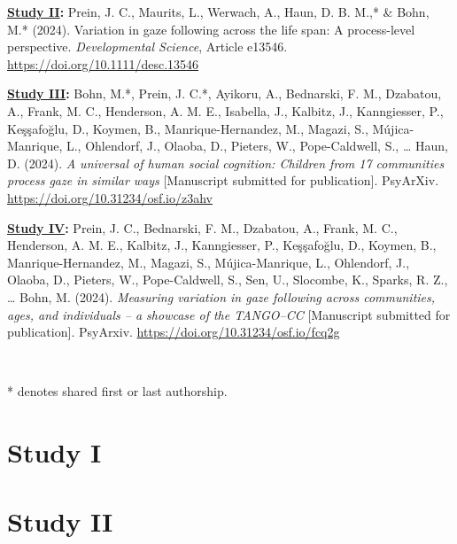 \documentclass[
]{scrbook}
\begin{document}
\textbf{\hyperref[studyII]{Study II}:} Prein, J. C., Maurits, L., Werwach, A., Haun, D. B. M.,* \& Bohn, M.* (2024). Variation in gaze following across the life span: A process-level perspective. \emph{Developmental Science}, Article e13546. \mbox{\url{https://doi.org/10.1111/desc.13546}}

\textbf{\hyperref[studyIII]{Study III}:} Bohn, M.*, Prein, J. C.*, Ayikoru, A., Bednarski, F. M., Dzabatou, A., Frank, M. C., Henderson, A. M. E., Isabella, J., Kalbitz, J., Kanngiesser, P., Keşşafoğlu, D., Koymen, B., Manrique-Hernandez, M., Magazi, S., Mújica-Manrique, L., Ohlendorf, J., Olaoba, D., Pieters, W., Pope-Caldwell, S., \ldots{} Haun, D. (2024). \emph{A universal of human social cognition: Children from 17 communities process gaze in similar ways} {[}Manuscript submitted for publication{]}. PsyArXiv. \mbox{\url{https://doi.org/10.31234/osf.io/z3ahv}}

\textbf{\hyperref[studyIV]{Study IV}:} Prein, J. C., Bednarski, F. M., Dzabatou, A., Frank, M. C., Henderson, A. M. E., Kalbitz, J., Kanngiesser, P., Keşşafoğlu, D., Koymen, B., Manrique-Hernandez, M., Magazi, S., Mújica-Manrique, L., Ohlendorf, J., Olaoba, D., Pieters, W., Pope-Caldwell, S., Sen, U., Slocombe, K., Sparks, R. Z., \ldots{} Bohn, M. (2024). \emph{Measuring variation in gaze following across communities, ages, and individuals -- a showcase of the TANGO--CC} {[}Manuscript submitted for publication{]}. PsyArxiv. \mbox{\url{https://doi.org/10.31234/osf.io/fcq2g}}

~

* denotes shared first or last authorship.

\newpage

\section*{Study I}\label{studyI}

\begin{minipage}{\textwidth}

\end{minipage}



\newpage

\section*{Study II}\label{studyII}
\end{document}
